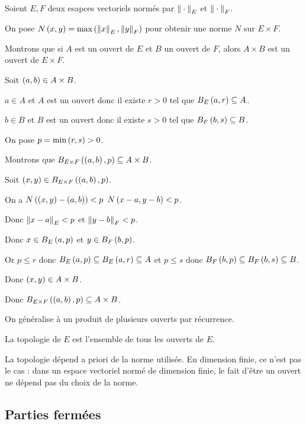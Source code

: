 \begin{dem}
Soient \(E,F\) deux esapces vectoriels normés par \(\norme{}_E\) et \(\norme{}_F\).

On pose \(N\paren{x,y}=\max\paren{\norme{x}_E,\norme{y}_F}\) pour obtenir une norme \(N\) sur \(E\times F\).

Montrons que si \(A\) est un ouvert de \(E\) et \(B\) un ouvert de \(F\), alors \(A\times B\) est un ouvert de \(E\times F\).

Soit \(\left(a,b\right)\in A\times B\).

\(a\in A\) et \(A\) est un ouvert donc il existe \(r>0\) tel que \(\bouleo[E]{a}{r}\subset A\).

\(b\in B\) et \(B\) est un ouvert donc il existe \(s>0\) tel que \(\bouleo[F]{b}{s}\subset B\).

On pose \(p=\min\left(r,s\right)>0\).

Montrons que \(\bouleo[E\times F]{\paren{a,b}}{p}\subset A\times B\).

Soit \(\paren{x,y}\in\bouleo[E\times F]{\paren{a,b}}{p}\).

On a \(N\left(\left(x,y\right)-\left(a,b\right)\right)<p\) \ie \(N\left(x-a,y-b\right)<p\).

Donc \(\norme{x-a}_E<p\) et \(\norme{y-b}_F<p\).

Donc \(x\in\bouleo[E]{a}{p}\) et \(y\in\bouleo[F]{b}{p}\).

Or \(p\leq r\) donc \(\bouleo[E]{a}{p}\subset\bouleo[E]{a}{r}\subset A\) et \(p\leq s\) donc \(\bouleo[F]{b}{p}\subset\bouleo[F]{b}{s}\subset B\).

Donc \(\left(x,y\right)\in A\times B\).

Donc \(\bouleo[E\times F]{\paren{a,b}}{p}\subset A\times B\).

On généralise à un produit de plusieurs ouverts par récurrence.
\end{dem}

La topologie de \(E\) est l'ensemble de tous les ouverts de \(E\).

\begin{rem}
La topologie dépend a priori de la norme utilisée. En dimension finie, ce n'est pas le cas : dans un espace vectoriel normé de dimension finie, le fait d'être un ouvert ne dépend pas du choix de la norme.
\end{rem}

\subsection{Parties fermées}

